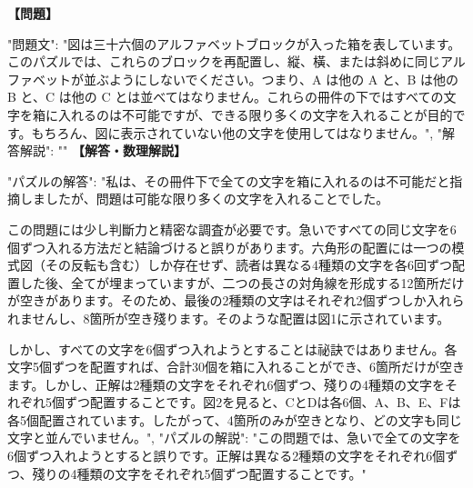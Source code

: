 \documentclass[10pt,a4paper,oneside,openany]{ltjsbook}
\begin{document}
\begin{tcolorbox}[colback=softblue,colframe=primaryblue,title=\textbf{第 305 問：THE THIRTY-SIX LETTER-BLOCKS.},arc=2mm,boxrule=1pt,breakable]
\textbf{【問題】}\par\vspace{0.3em}
{
  "問題文": "図は三十六個のアルファベットブロックが入った箱を表しています。このパズルでは、これらのブロックを再配置し、縦、橫、または斜めに同じアルファベットが並ぶようにしないでください。つまり、A は他の A と、B は他の B と、C は他の C とは並べてはなりません。これらの冊件の下ではすべての文字を箱に入れるのは不可能ですが、できる限り多くの文字を入れることが目的です。もちろん、図に表示されていない他の文字を使用してはなりません。",
  "解答解説": ""
}
\tcblower
\textbf{【解答・数理解説】}\par\vspace{0.3em}
{
"パズルの解答": "私は、その冊件下で全ての文字を箱に入れるのは不可能だと指摘しましたが、問題は可能な限り多くの文字を入れることでした。

この問題には少し判斷力と精密な調査が必要です。急いですべての同じ文字を6個ずつ入れる方法だと結論づけると誤りがあります。六角形の配置には一つの模式図（その反転も含む）しか存在せず、読者は異なる4種類の文字を各6回ずつ配置した後、全てが埋まっていますが、二つの長さの対角線を形成する12箇所だけが空きがあります。そのため、最後の2種類の文字はそれぞれ2個ずつしか入れられませんし、8箇所が空き殘ります。そのような配置は図1に示されています。

しかし、すべての文字を6個ずつ入れようとすることは祕訣ではありません。各文字5個ずつを配置すれば、合計30個を箱に入れることができ、6箇所だけが空きます。しかし、正解は2種類の文字をそれぞれ6個ずつ、殘りの4種類の文字をそれぞれ5個ずつ配置することです。図2を見ると、CとDは各6個、A、B、E、Fは各5個配置されています。したがって、4箇所のみが空きとなり、どの文字も同じ文字と並んでいません。",
"パズルの解説": "この問題では、急いで全ての文字を6個ずつ入れようとすると誤りです。正解は異なる2種類の文字をそれぞれ6個ずつ、殘りの4種類の文字をそれぞれ5個ずつ配置することです。"
}
\end{tcolorbox}
\end{document}
